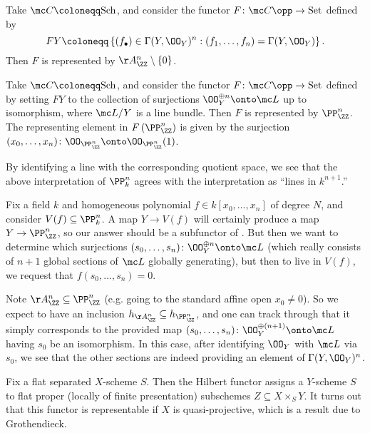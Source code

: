 \documentclass{article}
\begin{document}
\begin{example}
	Take $\mc C\coloneqq\mathrm{Sch}$, and consider the functor $F\colon\mc C\opp\to\mathrm{Set}$ defined by
	\[FY\coloneqq\left\{(f_\bullet)\in\Gamma(Y,\OO_Y)^n:(f_1,\ldots,f_n)=\Gamma(Y,\OO_Y)\right\}.\]
	Then $F$ is represented by $\AA^n_\ZZ\setminus\{0\}$.
\end{example}
\begin{example} \label{ex:moduli-pn}
	Take $\mc C\coloneqq\mathrm{Sch}$, and consider the functor $F\colon\mc C\opp\to\mathrm{Set}$ defined by setting $FY$ to the collection of surjections $\OO_Y^{\oplus n}\onto\mc L$ up to isomorphism, where $\mc L/Y$ is a line bundle. Then $F$ is represented by $\PP^n_\ZZ$. The representing element in $F\left(\PP^n_\ZZ\right)$ is given by the surjection $(x_0,\ldots,x_n)\colon\OO_{\PP^n_\ZZ}\onto\OO_{\PP^n_\ZZ}(1)$.
\end{example}
\begin{remark}
	By identifying a line with the corresponding quotient space, we see that the above interpretation of $\PP^n_k$ agrees with the interpretation as ``lines in $k^{n+1}$.''
\end{remark}
\begin{example}
	Fix a field $k$ and homogeneous polynomial $f\in k[x_0,\ldots,x_n]$ of degree $N$, and consider $V(f)\subseteq\PP^n_k$. A map $Y\to V(f)$ will certainly produce a map $Y\to\PP^n_\ZZ$, so our answer should be a subfunctor of . But then we want to determine which surjections $(s_0,\ldots,s_n)\colon\OO_Y^{\oplus n}\onto\mc L$ (which really consists of $n+1$ global sections of $\mc L$ globally generating), but then to live in $V(f)$, we request that $f(s_0,\ldots,s_n)=0$.
\end{example}
\begin{remark}
	Note $\AA^n_\ZZ\subseteq\PP^n_\ZZ$ (e.g. going to the standard affine open $x_0\ne0$). So we expect to have an inclusion $h_{\AA^n_\ZZ}\subseteq h_{\PP^n_\ZZ}$, and one can track through that it simply corresponds to the provided map $(s_0,\ldots,s_n)\colon\OO_Y^{\oplus(n+1)}\onto\mc L$ having $s_0$ be an isomorphism. In this case, after identifying $\OO_Y$ with $\mc L$ via $s_0$, we see that the other sections are indeed providing an element of $\Gamma(Y,\OO_Y)^n$.
\end{remark}
\begin{example}
	Fix a flat separated $X$-scheme $S$. Then the Hilbert functor assigns a $Y$-scheme $S$ to flat proper (locally of finite presentation) subschemes $Z\subseteq X\times_SY$. It turns out that this functor is representable if $X$ is quasi-projective, which is a result due to Grothendieck.
\end{example}
\end{document}
